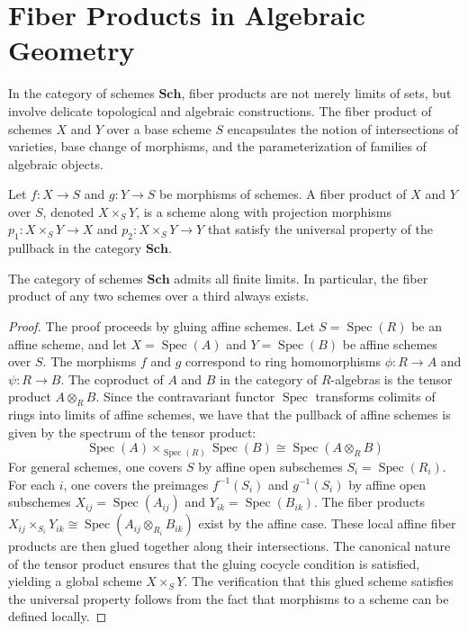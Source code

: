 \section{Fiber Products in Algebraic Geometry}

In the category of schemes $\mathbf{Sch}$, fiber products are not merely limits of sets, but involve delicate topological and algebraic constructions. The fiber product of schemes $X$ and $Y$ over a base scheme $S$ encapsulates the notion of intersections of varieties, base change of morphisms, and the parameterization of families of algebraic objects.

\begin{definition}
Let $f: X \to S$ and $g: Y \to S$ be morphisms of schemes. A fiber product of $X$ and $Y$ over $S$, denoted $X \times_S Y$, is a scheme along with projection morphisms $p_1: X \times_S Y \to X$ and $p_2: X \times_S Y \to Y$ that satisfy the universal property of the pullback in the category $\mathbf{Sch}$.
\end{definition}

\begin{theorem}
The category of schemes $\mathbf{Sch}$ admits all finite limits. In particular, the fiber product of any two schemes over a third always exists.
\end{theorem}

\begin{proof}
The proof proceeds by gluing affine schemes. 
Let $S = \operatorname{Spec}(R)$ be an affine scheme, and let $X = \operatorname{Spec}(A)$ and $Y = \operatorname{Spec}(B)$ be affine schemes over $S$. The morphisms $f$ and $g$ correspond to ring homomorphisms $\phi: R \to A$ and $\psi: R \to B$. 
The coproduct of $A$ and $B$ in the category of $R$-algebras is the tensor product $A \otimes_R B$.
Since the contravariant functor $\operatorname{Spec}$ transforms colimits of rings into limits of affine schemes, we have that the pullback of affine schemes is given by the spectrum of the tensor product:
\[
\operatorname{Spec}(A) \times_{\operatorname{Spec}(R)} \operatorname{Spec}(B) \cong \operatorname{Spec}(A \otimes_R B)
\]
For general schemes, one covers $S$ by affine open subschemes $S_i = \operatorname{Spec}(R_i)$. For each $i$, one covers the preimages $f^{-1}(S_i)$ and $g^{-1}(S_i)$ by affine open subschemes $X_{ij} = \operatorname{Spec}(A_{ij})$ and $Y_{ik} = \operatorname{Spec}(B_{ik})$. 
The fiber products $X_{ij} \times_{S_i} Y_{ik} \cong \operatorname{Spec}(A_{ij} \otimes_{R_i} B_{ik})$ exist by the affine case.
These local affine fiber products are then glued together along their intersections. The canonical nature of the tensor product ensures that the gluing cocycle condition is satisfied, yielding a global scheme $X \times_S Y$.
The verification that this glued scheme satisfies the universal property follows from the fact that morphisms to a scheme can be defined locally.
\end{proof}

